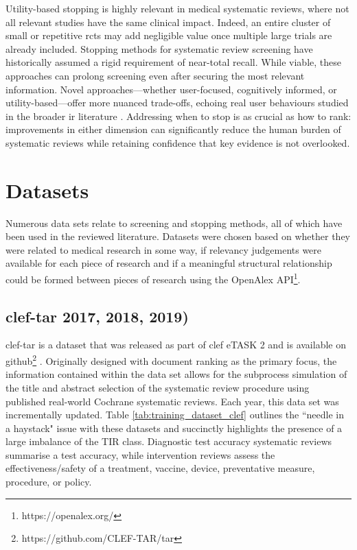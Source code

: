 \documentclass[10pt,oneside]{book}
\begin{document}
Utility-based stopping is highly relevant in medical systematic reviews, where not all relevant studies have the same clinical impact. Indeed, an entire cluster of small or repetitive \glspl*{rct} may add negligible value once multiple large trials are already included. Stopping methods for systematic review screening have historically assumed a rigid requirement of near-total recall. While viable, these approaches can prolong screening even after securing the most relevant information. Novel approaches—whether user-focused, cognitively informed, or utility-based—offer more nuanced trade-offs, echoing real user behaviours studied in the broader \gls*{ir} literature \cite{browne_stopping_2005, ilani_analysis_2024}. Addressing when to stop is as crucial as how to rank: improvements in either dimension can significantly reduce the human burden of systematic reviews while retaining confidence that key evidence is not overlooked.

\section{Datasets}\label{sec:datasets}

Numerous data sets relate to screening and stopping methods, all of which have been used in the reviewed literature. Datasets were chosen based on whether they were related to medical research in some way, if relevancy judgements were available for each piece of research and if a meaningful structural relationship could be formed between pieces of research using the OpenAlex API\footnote{https://openalex.org/}.

\subsection{\gls*{clef}-\gls*{tar} 2017, 2018, 2019)}

\gls*{clef}-\gls*{tar} is a dataset that was released as part of \gls*{clef} eTASK 2 and is available on github\footnote{https://github.com/CLEF-TAR/tar} \cite{kanoulas_clef_2017, kanoulas_clef_2018, kanoulas_clef_2019}. Originally designed with document ranking as the primary focus, the information contained within the data set allows for the subprocess simulation of the title and abstract selection of the systematic review procedure using published real-world Cochrane systematic reviews. Each year, this data set was incrementally updated. Table \ref{tab:training_dataset_clef} outlines the ``needle in a haystack" issue with these datasets and succinctly highlights the presence of a large imbalance of the TIR class. Diagnostic test accuracy systematic reviews summarise a test accuracy, while intervention reviews assess the effectiveness/safety of a treatment, vaccine, device, preventative measure, procedure, or policy.
\end{document}
